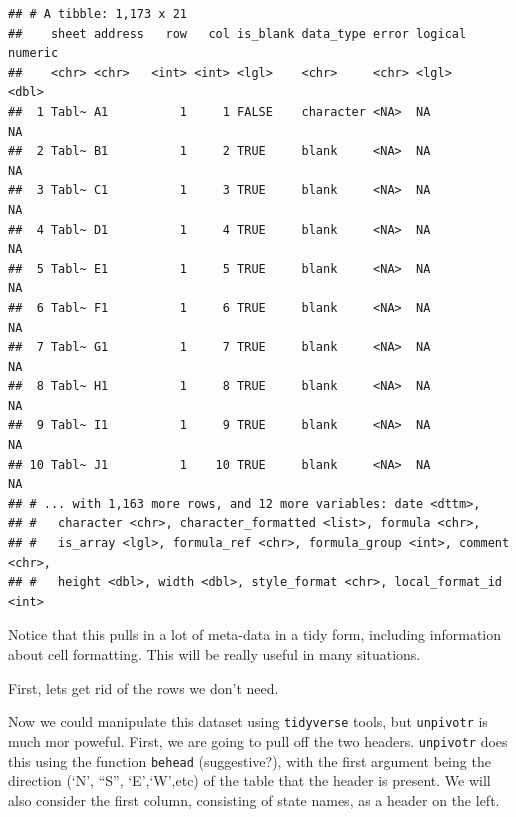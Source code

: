 \documentclass[12pt,letterpaperpaper,openany]{book}
\newenvironment{Shaded}{\begin{snugshade}}{\end{snugshade}}
\newcommand{\DecValTok}[1]{\textcolor[rgb]{0.00,0.00,0.81}{#1}}
\newcommand{\KeywordTok}[1]{\textcolor[rgb]{0.13,0.29,0.53}{\textbf{#1}}}
\newcommand{\NormalTok}[1]{#1}
\newcommand{\OperatorTok}[1]{\textcolor[rgb]{0.81,0.36,0.00}{\textbf{#1}}}
\newcommand{\StringTok}[1]{\textcolor[rgb]{0.31,0.60,0.02}{#1}}
\begin{document}
\begin{verbatim}
## # A tibble: 1,173 x 21
##    sheet address   row   col is_blank data_type error logical numeric
##    <chr> <chr>   <int> <int> <lgl>    <chr>     <chr> <lgl>     <dbl>
##  1 Tabl~ A1          1     1 FALSE    character <NA>  NA           NA
##  2 Tabl~ B1          1     2 TRUE     blank     <NA>  NA           NA
##  3 Tabl~ C1          1     3 TRUE     blank     <NA>  NA           NA
##  4 Tabl~ D1          1     4 TRUE     blank     <NA>  NA           NA
##  5 Tabl~ E1          1     5 TRUE     blank     <NA>  NA           NA
##  6 Tabl~ F1          1     6 TRUE     blank     <NA>  NA           NA
##  7 Tabl~ G1          1     7 TRUE     blank     <NA>  NA           NA
##  8 Tabl~ H1          1     8 TRUE     blank     <NA>  NA           NA
##  9 Tabl~ I1          1     9 TRUE     blank     <NA>  NA           NA
## 10 Tabl~ J1          1    10 TRUE     blank     <NA>  NA           NA
## # ... with 1,163 more rows, and 12 more variables: date <dttm>,
## #   character <chr>, character_formatted <list>, formula <chr>,
## #   is_array <lgl>, formula_ref <chr>, formula_group <int>, comment <chr>,
## #   height <dbl>, width <dbl>, style_format <chr>, local_format_id <int>
\end{verbatim}

Notice that this pulls in a lot of meta-data in a tidy form, including information
about cell formatting. This will be really useful in many situations.

First, lets get rid of the rows we don't need.

\begin{Shaded}
\end{Shaded}

Now we could manipulate this dataset using \texttt{tidyverse} tools, but \texttt{unpivotr} is much mor poweful.
First, we are going to pull off the two headers. \texttt{unpivotr} does this using the function \texttt{behead} (suggestive?),
with the first argument being the direction (`N', ``S'', `E',`W',etc) of the table that the header is present. We will
also consider the first column, consisting of state names, as a header on the left.
\end{document}
